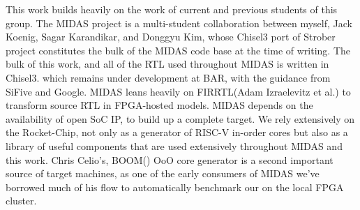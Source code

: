 This work builds heavily on the work of current and previous students of this
group. The MIDAS project is a multi-student collaboration between myself, Jack
Koenig, Sagar Karandikar, and Donggyu Kim, whose Chisel3 port of
Strober\cite{strober} project constitutes the bulk of the MIDAS code base at
the time of writing. The bulk of this work, and all of the RTL used throughout
MIDAS is written in Chisel3\cite{chisel}. which remains under development at
BAR, with the guidance from SiFive and Google.  MIDAS leans heavily on
FIRRTL\cite{firrtl}(Adam Izraelevitz et al.) to transform source RTL in
FPGA-hosted models. MIDAS depends on the availability of open SoC IP, to build
up a complete target. We rely extensively on the Rocket-Chip\cite{rocketchip},
not only as a generator of RISC-V in-order cores but also as a library of
useful components that are used extensively throughout MIDAS and this work.
Chris Celio's, BOOM(\cite{boom}) OoO core generator is a second important
source of target machines, as one of the early consumers of MIDAS we've
borrowed much of his flow to automatically benchmark our  on the local FPGA
cluster.




